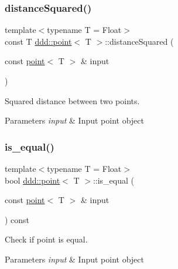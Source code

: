 \subsubsection{\texorpdfstring{distance\+Squared()}{distanceSquared()}}
{\footnotesize\ttfamily template$<$typename T = Float$>$ \\
const T \hyperlink{classddd_1_1point}{ddd\+::point}$<$ T $>$\+::distance\+Squared (\begin{DoxyParamCaption}\item[{const \hyperlink{classddd_1_1point}{point}$<$ T $>$ \&}]{input }\end{DoxyParamCaption})\hspace{0.3cm}{\ttfamily [inline]}}



Squared distance between two points. 


\begin{DoxyParams}{Parameters}
{\em input} & Input point object \\
\hline
\end{DoxyParams}
\mbox{\label{classddd_1_1point_aa4cdbbf16736ee09e840e33f77e94b8a}} 
\subsubsection{\texorpdfstring{is\+\_\+equal()}{is\_equal()}}
{\footnotesize\ttfamily template$<$typename T = Float$>$ \\
bool \hyperlink{classddd_1_1point}{ddd\+::point}$<$ T $>$\+::is\+\_\+equal (\begin{DoxyParamCaption}\item[{const \hyperlink{classddd_1_1point}{point}$<$ T $>$ \&}]{input }\end{DoxyParamCaption}) const\hspace{0.3cm}{\ttfamily [inline]}}



Check if point is equal. 


\begin{DoxyParams}{Parameters}
{\em input} & Input point object \\
\hline
\end{DoxyParams}
\mbox{\label{classddd_1_1point_a2567b8c3cd08d965e70033f3f4a8d3db}} 
